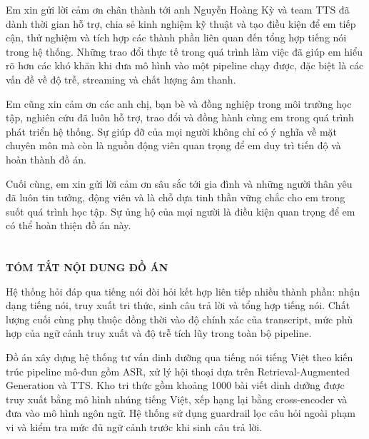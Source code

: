 \documentclass[a4paper,13pt,twoside]{report}
\begin{document}
Em xin gửi lời cảm ơn chân thành tới anh Nguyễn Hoàng Kỳ và team TTS đã dành thời gian hỗ trợ, chia sẻ kinh nghiệm kỹ thuật và tạo điều kiện để em tiếp cận, thử nghiệm và tích hợp các thành phần liên quan đến tổng hợp tiếng nói trong hệ thống. Những trao đổi thực tế trong quá trình làm việc đã giúp em hiểu rõ hơn các khó khăn khi đưa mô hình vào một pipeline chạy được, đặc biệt là các vấn đề về độ trễ, streaming và chất lượng âm thanh.

Em cũng xin cảm ơn các anh chị, bạn bè và đồng nghiệp trong môi trường học tập, nghiên cứu đã luôn hỗ trợ, trao đổi và đồng hành cùng em trong quá trình phát triển hệ thống. Sự giúp đỡ của mọi người không chỉ có ý nghĩa về mặt chuyên môn mà còn là nguồn động viên quan trọng để em duy trì tiến độ và hoàn thành đồ án.

Cuối cùng, em xin gửi lời cảm ơn sâu sắc tới gia đình và những người thân yêu đã luôn tin tưởng, động viên và là chỗ dựa tinh thần vững chắc cho em trong suốt quá trình học tập. Sự ủng hộ của mọi người là điều kiện quan trọng để em có thể hoàn thiện đồ án này.

\newpage

\chapter*{}
\vspace*{-1.8cm}
\begin{center}
    {\textbf{\LARGE TÓM TẮT NỘI DUNG ĐỒ ÁN}}
\end{center}
\vspace{1.0cm}

Hệ thống hỏi đáp qua tiếng nói đòi hỏi kết hợp liên tiếp nhiều thành phần: nhận dạng tiếng nói, truy xuất tri thức, sinh câu trả lời và tổng hợp tiếng nói. Chất lượng cuối cùng phụ thuộc đồng thời vào độ chính xác của transcript, mức phù hợp của ngữ cảnh truy xuất và độ trễ tích lũy trong toàn bộ pipeline.

Đồ án xây dựng hệ thống tư vấn dinh dưỡng qua tiếng nói tiếng Việt theo kiến trúc pipeline mô-đun gồm ASR, xử lý hội thoại dựa trên Retrieval-Augmented Generation và TTS. Kho tri thức gồm khoảng 1000 bài viết dinh dưỡng được truy xuất bằng mô hình nhúng tiếng Việt, xếp hạng lại bằng cross-encoder và đưa vào mô hình ngôn ngữ. Hệ thống sử dụng guardrail lọc câu hỏi ngoài phạm vi và kiểm tra mức đủ ngữ cảnh trước khi sinh câu trả lời.
\end{document}
